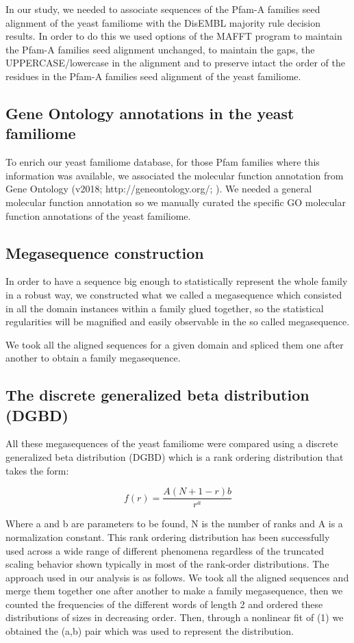 \documentclass[preprint,12pt]{elsarticle}
\begin{document}
In our study, we needed to associate sequences of the Pfam-A families seed alignment of the yeast familiome with the DisEMBL majority rule decision results. In order to do this we used options of the MAFFT program to maintain the Pfam-A families seed alignment unchanged, to maintain the gaps, the UPPERCASE/lowercase in the alignment and to preserve intact the order of the residues \cite{katoh2012adding} \cite{katoh2012adding} in the Pfam-A families seed alignment of the yeast familiome.  


\subsection{Gene Ontology annotations in the yeast familiome}

To enrich our yeast familiome database, for those Pfam families where this information was available, we associated the molecular function annotation from Gene Ontology (v2018; http://geneontology.org/; \cite{ashburner2000gene} \cite{gene2015gene}). We needed a general molecular function annotation so we manually curated the specific GO molecular function annotations of the yeast familiome.


\subsection{Megasequence construction}
In order to have a sequence big enough to statistically represent the whole family in a robust way, we constructed what we called a megasequence which consisted in all the domain instances within a family glued together, so the statistical regularities will be magnified and easily observable in the so called megasequence.

We took all the aligned sequences for a given domain and spliced them one after another to obtain a family megasequence.

\subsection{The discrete generalized beta distribution (DGBD)}

All these megasequences of the yeast familiome were compared using a discrete generalized beta distribution (DGBD) \cite{martinez2009universality} \cite{petersen2011statistical} which is a rank ordering distribution that takes the form:

\[
f(r) = \dfrac{A(N+1-r)b}{r^a}  
\]

Where a and b are parameters to be found, N is the number of ranks and A is a normalization constant. This rank ordering distribution has been successfully used across a wide range of different phenomena regardless of the truncated scaling behavior shown typically in most of the rank-order distributions.
The approach used in our analysis is as follows. We took all the aligned sequences and merge them together one after another to make a family megasequence, then we counted the frequencies of the different words of length 2 and ordered these distributions of sizes in decreasing order. Then, through a nonlinear fit of (1) we obtained the (a,b) pair which was used to represent the distribution. 
\end{document}
